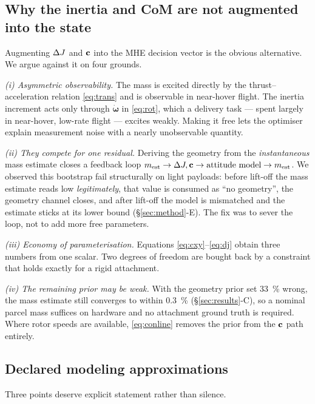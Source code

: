 \subsection{Why the inertia and CoM are not augmented into the state}\label{sec:model:whynot}

Augmenting $\Delta J$ and $\mathbf{c}$ into the MHE decision vector is the obvious
alternative. We argue against it on four grounds.

\emph{(i) Asymmetric observability.} The mass is excited directly by the
thrust--acceleration relation \eqref{eq:trans} and is observable in
near-hover flight. The inertia increment acts only through
$\dot{\boldsymbol{\omega}}$ in \eqref{eq:rot}, which a delivery task ---
spent largely in near-hover, low-rate flight --- excites weakly. Making it
free lets the optimiser explain measurement noise with a nearly
unobservable quantity.

\emph{(ii) They compete for one residual.} Deriving the geometry from the
\emph{instantaneous} mass estimate closes a feedback loop
$m_{\mathrm{est}} \rightarrow \Delta J, \mathbf{c} \rightarrow \text{attitude model}
\rightarrow m_{\mathrm{est}}$. We observed this bootstrap fail structurally
on light payloads: before lift-off the mass estimate reads low
\emph{legitimately}, that value is consumed as ``no geometry'', the
geometry channel closes, and after lift-off the model is mismatched and
the estimate sticks at its lower bound (\S\ref{sec:method}-E). The fix was
to sever the loop, not to add more free parameters.

\emph{(iii) Economy of parameterisation.} Equations
\eqref{eq:cxy}--\eqref{eq:dj} obtain three numbers from one scalar. Two
degrees of freedom are bought back by a constraint that holds exactly for a
rigid attachment.

\emph{(iv) The remaining prior may be weak.} With the geometry prior set
\SI{33}{\percent} wrong, the mass estimate still converges to within
\SI{0.3}{\percent} (\S\ref{sec:results}-C), so a nominal parcel mass
suffices on hardware and no attachment ground truth is required. Where
rotor speeds are available, \eqref{eq:conline} removes the prior from the
$\mathbf{c}$ path entirely.

\subsection{Declared modeling approximations}\label{sec:model:approx}

Three points deserve explicit statement rather than silence.

